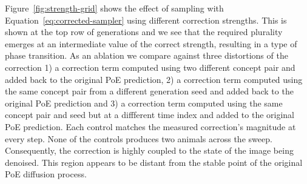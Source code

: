 \documentclass{article} %
\begin{document}
Figure~\ref{fig:strength-grid} shows the effect of sampling with Equation~\ref{eq:corrected-sampler} using different correction strengths. This is shown at the top row of generations and we see that the required plurality emerges at an intermediate value of the correct strength, resulting in a type of phase transition. As an ablation we compare against three distortions of the correction
1) a correction term computed using two different concept pair and added back to the original PoE prediction, 2) a correction term computed using the same concept pair from a different generation seed and added back to the original PoE prediction and 3) a correction term computed using the same concept pair and seed but at a diffferent time index and added to the original PoE prediction. Each control matches the measured correction's magnitude at
every step. None of the controls produces two animals across the sweep. Consequently, the correction is highly coupled to the state of the image being denoised. This region appears to be distant from the stable point of the original PoE diffusion process.





\end{document}
